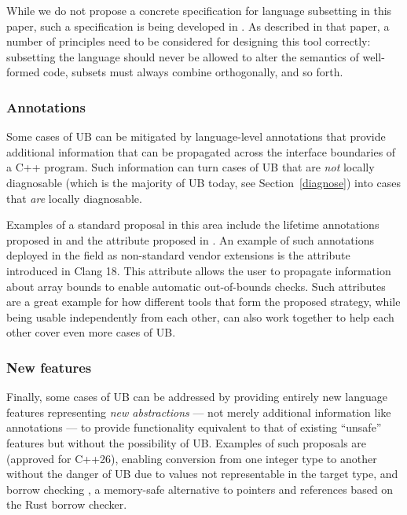 {While we do not propose a concrete specification for language subsetting in this paper, such a specification is being developed in \cite{P3716R0}. As described in that paper, a number of principles need to be considered for designing this tool correctly: subsetting the language should never be allowed to alter the semantics of well-formed code, subsets must always combine orthogonally, and so forth. 

\subsubsection{Annotations}
\label{annotations}

Some cases of UB can be mitigated by language-level annotations that provide additional information that can be propagated across the interface boundaries of a C++ program. Such information can turn cases of UB that are \emph{not} locally diagnosable (which is the majority of UB today, see Section~\ref{diagnose}) into cases that \emph{are} locally diagnosable.

Examples of a standard proposal in this area include the lifetime annotations proposed in \cite{P2771R1} and the  attribute proposed in \cite{P3984R0}. An example of such annotations deployed in the field as non-standard vendor extensions is the  attribute introduced in Clang 18. This attribute allows the user to propagate information about array bounds to enable automatic out-of-bounds checks. Such attributes are a great example for how different tools that form the proposed strategy, while being usable independently from each other, can also work together to help each other cover even more cases of UB.

\subsubsection{New features}
\label{newfeatures}

Finally, some cases of UB can be addressed by providing entirely new language features representing \emph{new abstractions} --- not merely additional information like annotations --- to provide functionality equivalent to that of existing ``unsafe'' features but without the possibility of UB. Examples of such proposals are  \cite{P0543R3} (approved for C++26), enabling conversion from one integer type to another without the danger of UB due to values not representable in the target type, and borrow checking \cite{P3390R0}, a memory-safe alternative to pointers and references based on the Rust borrow checker.

}
